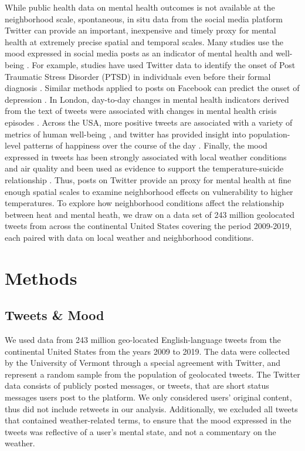 \documentclass[titlepage]{article}
\begin{document}
While public health data on mental health outcomes is not available at the neighborhood scale, spontaneous, in situ data from the social media platform Twitter can provide an important, inexpensive and timely proxy for mental health at extremely precise spatial and temporal scales. Many studies use the mood expressed in social media posts as an indicator of mental health and well-being \citep{Edo-Osagie2020Jul, Sinnenberg2016Dec}. For example, studies have used Twitter data to identify the onset of Post Traumatic Stress Disorder (PTSD) in individuals even before their formal diagnosis \citep{Reece2017Oct}. Similar methods applied to posts on Facebook can predict the onset of depression \citep{Eichstaedt2018Oct}. In London, day-to-day changes in mental health indicators derived from the text of tweets were associated with changes in mental health crisis episodes \citep{Kolliakou2020Feb}. Across the USA, more positive tweets are associated with a variety of metrics of human well-being \citep{Mitchell2013May}, and twitter has provided insight into population-level patterns of happiness over the course of the day \citep{Dodds2011}. Finally, the mood expressed in tweets has been strongly associated with local weather conditions and air quality \citep{baylis_weather_2018, Zheng2019} and been used as evidence to support the temperature-suicide relationship \citep{Burke2018Aug}. Thus, posts on Twitter provide an proxy for mental health at fine enough spatial scales to examine neighborhood effects on vulnerability to higher temperatures. To explore how neighborhood conditions affect the relationship between heat and mental heath, we draw on a data set of 243 million geolocated tweets from across the continental United States covering the period 2009-2019, each paired with data on local weather and neighborhood conditions.

\section*{Methods}
\subsection*{Tweets \& Mood}
We used data from 243 million geo-located English-language tweets from the continental United States from the years 2009 to 2019. The data were collected by the University of Vermont through a special agreement with Twitter, and represent a random sample from the population of geolocated tweets.  The Twitter data consists of publicly posted messages, or tweets, that are short status messages users post to the platform. We only considered users’ original content, thus did not include retweets in our analysis. Additionally, we excluded all tweets that contained weather-related terms, to ensure that the mood expressed in the tweets was reflective of a user's mental state, and not a commentary on the weather.
\end{document}

